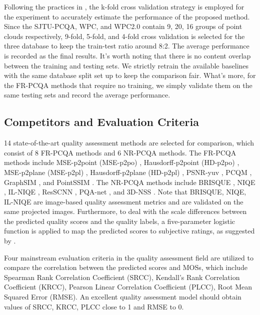 \documentclass{article}
\begin{document}
Following the practices in \cite{fan2022no}, the k-fold cross validation strategy is employed for the experiment to accurately estimate the performance of the proposed method. Since the SJTU-PCQA, WPC, and WPC2.0 contain 9, 20, 16 groups of point clouds respectively, 9-fold, 5-fold, and 4-fold cross validation is selected for the three database to keep the train-test ratio around 8:2. The average performance is recorded as the final results.
It's worth noting that there is no content overlap between the training and testing sets. We strictly retrain the available baselines with the same database split set up to keep the comparison fair. What's more, for the FR-PCQA methods that require no training, we simply validate them on the same testing sets and record the average performance.

\subsection{Competitors and Evaluation Criteria}
14 state-of-the-art quality assessment methods are selected for comparison, which consist of 8 FR-PCQA methods and 6 NR-PCQA methods. The FR-PCQA methods include MSE-p2point (MSE-p2po) \cite{mekuria2016evaluation}, Hausdorff-p2point (HD-p2po) \cite{mekuria2016evaluation}, MSE-p2plane (MSE-p2pl) \cite{tian2017geometric}, Hausdorff-p2plane (HD-p2pl) \cite{tian2017geometric}, PSNR-yuv \cite{torlig2018novel}, PCQM \cite{meynet2020pcqm}, GraphSIM \cite{yang2020graphsim}, and PointSSIM \cite{alexiou2020pointssim}.  The NR-PCQA methods include BRISQUE \cite{mittal2012brisque}, NIQE \cite{mittal2012making}, IL-NIQE \cite{zhang2015feature}, ResSCNN \cite{liu2022point}, PQA-net \cite{liu2021pqa}, and 3D-NSS \cite{zhang2021no}. Note that BRISQUE, NIQE, IL-NIQE are image-based quality assessment metrics and are validated on the same projected images.
Furthermore, to deal with the scale differences between the predicted quality scores and the quality labels, a five-parameter logistic function is applied to map the predicted scores to subjective ratings, as suggested by \cite{antkowiak2000final}.





Four mainstream evaluation criteria in the quality assessment field are utilized to compare the correlation between the predicted scores and MOSs, which include Spearman Rank Correlation Coefficient (SRCC), Kendall’s Rank Correlation Coefficient (KRCC), Pearson Linear Correlation Coefficient (PLCC), Root Mean Squared Error (RMSE). 
An excellent quality assessment model should obtain values of SRCC, KRCC, PLCC close to 1 and RMSE to 0.
\end{document}
